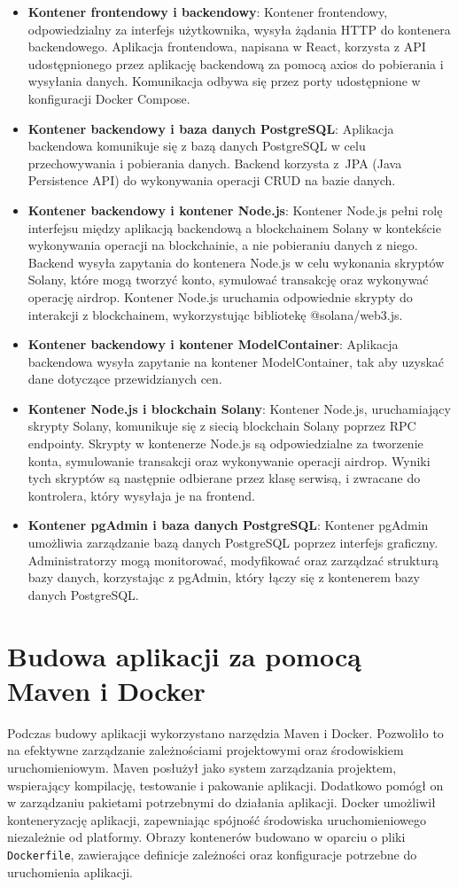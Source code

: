 \begin{itemize}
    \item \textbf{Kontener frontendowy i backendowy}: Kontener frontendowy, odpowiedzialny za interfejs użytkownika, wysyła żądania HTTP do kontenera backendowego. Aplikacja frontendowa, napisana w React, korzysta z API udostępnionego przez aplikację backendową za pomocą axios do pobierania i wysyłania danych. Komunikacja odbywa się przez porty udostępnione w konfiguracji Docker Compose.
    \item \textbf{Kontener backendowy i baza danych PostgreSQL}: Aplikacja backendowa komunikuje się z bazą danych PostgreSQL w celu przechowywania i pobierania danych. Backend korzysta z~JPA (Java Persistence API) do wykonywania operacji CRUD na bazie danych.
    \item \textbf{Kontener backendowy i kontener Node.js}: Kontener Node.js pełni rolę interfejsu między aplikacją backendową a blockchainem Solany w kontekście wykonywania operacji na blockchainie, a nie pobieraniu danych z niego. Backend wysyła zapytania do kontenera Node.js w celu wykonania skryptów Solany, które mogą tworzyć konto, symulować transakcję oraz wykonywać operację airdrop. Kontener Node.js uruchamia odpowiednie skrypty do interakcji z blockchainem, wykorzystując bibliotekę @solana/web3.js.
		\item \textbf{Kontener backendowy i kontener ModelContainer}: Aplikacja backendowa wysyła zapytanie na kontener ModelContainer, tak aby uzyskać dane dotyczące przewidzianych cen. 
    \item \textbf{Kontener Node.js i blockchain Solany}: Kontener Node.js, uruchamiający skrypty Solany, komunikuje się z siecią blockchain Solany poprzez RPC endpointy. Skrypty w kontenerze Node.js są odpowiedzialne za tworzenie konta, symulowanie transakcji oraz wykonywanie operacji airdrop. Wyniki tych skryptów są następnie odbierane przez klasę serwisą, i zwracane do kontrolera, który wysyłaja je na frontend.
    \item \textbf{Kontener pgAdmin i baza danych PostgreSQL}: Kontener pgAdmin umożliwia zarządzanie bazą danych PostgreSQL poprzez interfejs graficzny. Administratorzy mogą monitorować, modyfikować oraz zarządzać strukturą bazy danych, korzystając z pgAdmin, który łączy się z kontenerem bazy danych PostgreSQL.
\end{itemize}

\section{Budowa aplikacji za pomocą Maven i Docker}
Podczas budowy aplikacji wykorzystano narzędzia Maven i Docker. Pozwoliło to na efektywne zarządzanie  zależnościami projektowymi oraz środowiskiem uruchomieniowym. Maven posłużył jako system zarządzania projektem, wspierający kompilację, testowanie i pakowanie aplikacji. Dodatkowo pomógł on w zarządzaniu pakietami potrzebnymi do działania aplikacji. Docker umożliwił konteneryzację aplikacji, zapewniając spójność środowiska uruchomieniowego niezależnie od platformy. Obrazy kontenerów budowano w oparciu o pliki \texttt{Dockerfile}, zawierające definicje zależności oraz konfiguracje potrzebne do uruchomienia aplikacji. 

